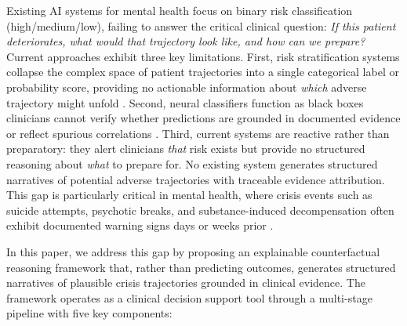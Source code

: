 \documentclass[conference]{IEEEtran}
\begin{document}
Existing AI systems for mental health focus on binary risk classification (high/medium/low), failing to answer the critical clinical question: \textit{If this patient deteriorates, what would that trajectory look like, and how can we prepare?} Current approaches exhibit three key limitations. First, risk stratification systems collapse the complex space of patient trajectories into a single categorical label or probability score, providing no actionable information about \textit{which} adverse trajectory might unfold \cite{b16}. Second, neural classifiers function as black boxes clinicians cannot verify whether predictions are grounded in documented evidence or reflect spurious correlations \cite{b10}. Third, current systems are reactive rather than preparatory: they alert clinicians \textit{that} risk exists but provide no structured reasoning about \textit{what} to prepare for. No existing system generates structured narratives of potential adverse trajectories with traceable evidence attribution. This gap is particularly critical in mental health, where crisis events such as suicide attempts, psychotic breaks, and substance-induced decompensation often exhibit documented warning signs days or weeks prior \cite{b2, b6}.

In this paper, we address this gap by proposing an explainable counterfactual reasoning framework that, rather than predicting outcomes, generates structured narratives of plausible crisis trajectories grounded in clinical evidence. The framework operates as a clinical decision support tool through a multi-stage pipeline with five key components:
\end{document}
